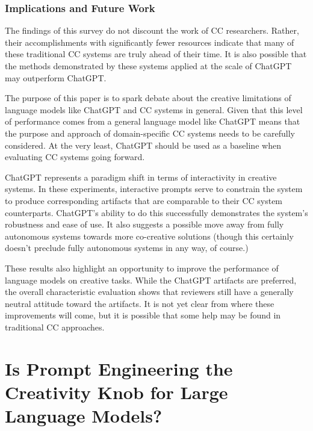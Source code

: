 \documentclass[phd,electronic,oneside,twosidetoc,letterpaper,chaptercenter,parttop,lof]{byumsphd}
\begin{document}
\subsection{Implications and Future Work}
The findings of this survey do not discount the work of CC researchers. 
Rather, their accomplishments with significantly fewer resources indicate that many of these traditional CC systems are truly ahead of their time.
It is also possible that the methods demonstrated by these systems applied at the scale of ChatGPT may outperform ChatGPT.

The purpose of this paper is to spark debate about the creative limitations of language models like ChatGPT and CC systems in general. 
Given that this level of performance comes from a general language model like ChatGPT means that the purpose and approach of domain-specific CC systems needs to be carefully considered. At the very least, ChatGPT should be used as a baseline when evaluating CC systems going forward.

ChatGPT represents a paradigm shift in terms of interactivity in creative systems. 
In these experiments, interactive prompts serve to constrain the system to produce corresponding artifacts that are comparable to their CC system counterparts. 
ChatGPT's ability to do this successfully demonstrates the system's robustness and ease of use. It also suggests a possible move away from fully autonomous systems towards more co-creative solutions (though this certainly doesn't preclude fully autonomous systems in any way, of course.)

These results also highlight an opportunity to improve the performance of language models on creative tasks.
While the ChatGPT artifacts are preferred, the overall characteristic evaluation shows that reviewers still have a generally neutral attitude toward the artifacts. 
It is not yet clear from where these improvements will come, but it is possible that some help may be found in traditional CC approaches. 




\chapter{Is Prompt Engineering the Creativity Knob for Large Language Models?}
\label{chap:cc_prompting}
\end{document}
